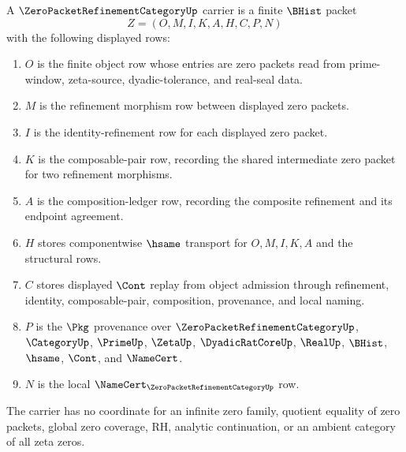 \begin{definition}
\label{def:zero-packet-refinement-category-carrier}
A $\ZeroPacketRefinementCategoryUp$ carrier is a finite $\BHist$ packet
$$
Z=(O,M,I,K,A,H,C,P,N)
$$
with the following displayed rows:
\begin{enumerate}
\item $O$ is the finite object row whose entries are zero packets read from prime-window, zeta-source, dyadic-tolerance, and real-seal data.
\item $M$ is the refinement morphism row between displayed zero packets.
\item $I$ is the identity-refinement row for each displayed zero packet.
\item $K$ is the composable-pair row, recording the shared intermediate zero packet for two refinement morphisms.
\item $A$ is the composition-ledger row, recording the composite refinement and its endpoint agreement.
\item $H$ stores componentwise $\hsame$ transport for $O,M,I,K,A$ and the structural rows.
\item $C$ stores displayed $\Cont$ replay from object admission through refinement, identity, composable-pair, composition, provenance, and local naming.
\item $P$ is the $\Pkg$ provenance over $\ZeroPacketRefinementCategoryUp$, $\CategoryUp$, $\PrimeUp$, $\ZetaUp$, $\DyadicRatCoreUp$, $\RealUp$, $\BHist$, $\hsame$, $\Cont$, and $\NameCert$.
\item $N$ is the local $\NameCert_{\ZeroPacketRefinementCategoryUp}$ row.
\end{enumerate}
The carrier has no coordinate for an infinite zero family, quotient equality of zero packets, global zero coverage, RH, analytic continuation, or an ambient category of all zeta zeros.
\end{definition}

